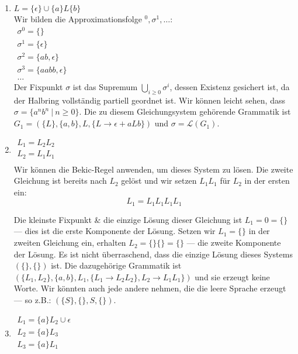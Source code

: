 \documentclass[]{scrartcl}
\newcommand{\grule}[2]{#1 \rightarrow #2}
\newcommand{\grammar}[4]{(#1,#2,#3,#4)}
\begin{document}
\begin{enumerate}
	\item $L = \{\epsilon\} \cup \{a\}L\{b\}$\\
	Wir bilden die Approximationsfolge $^0, \sigma^1, \dots$:\\
	$
		\begin{array}{l}
		\sigma^0 = \{\}\\
		\sigma^1 = \{\epsilon\}\\
		\sigma^2 = \{ab, \epsilon\}\\
		\sigma^3 = \{aabb, \epsilon\}\\
		\dots
		\end{array}
	$\\
	
	Der Fixpunkt $\sigma$ ist das Supremum $\bigcup_{i \geq 0} \sigma^i$, dessen Existenz gesichert ist, da der Halbring vollständig partiell geordnet ist. Wir können leicht sehen, dass $\sigma = \{a^nb^n\ |\ n \geq 0\}$. Die zu diesem Gleichungsystem gehörende Grammatik ist $G_1 = \grammar{\{L\}}{\{a,b\}}{L}{\{\grule{L}{\epsilon+aLb}\}}$ und $\sigma = \mathcal{L}(G_1)$.
	
	\item $
		\begin{array}{l}
		L_1 = L_2L_2\\
		L_2 = L_1L_1\\
		\end{array}
	$\\
	
	Wir können die Bekic-Regel anwenden, um dieses System zu lösen. Die zweite Gleichung ist bereits nach $L_2$ gelöst und wir setzen $L_1L_1$ für $L_2$ in der ersten ein:
	$$
		L_1 = L_1L_1L_1L_1
	$$
	
	Die kleinste Fixpunkt \& die einzige Lösung dieser Gleichung ist $L_1=0=\{\}$ --- dies ist die erste Komponente der Lösung. Setzen wir $L_1 = \{\}$ in der zweiten Gleichung ein, erhalten $L_2 = \{\}\{\} = \{\}$ --- die zweite Komponente der Lösung. Es ist nicht überraschend, dass die einzige Lösung dieses Systems $(\{\},\{\})$ ist. Die dazugehörige Grammatik ist $\grammar{\{L_1,L_2\}}{\{a,b\}}{L_1}{\{\grule{L_1}{L_2L_2}\}, \grule{L_2}{L_1L_1}\}}$ und sie erzeugt keine Worte. Wir könnten auch jede andere nehmen, die die leere Sprache erzeugt --- so z.B.: $\grammar{\{S\}}{\{\}}{S}{\{\}}$.
	
	\item $
			\begin{array}{l}
			L_1 = \{a\}L_2 \cup \epsilon\\
			L_2 = \{a\}L_3\\
			L_3 = \{a\}L_1\\
			\end{array}
		$\\
		

\end{enumerate}
\end{document}

